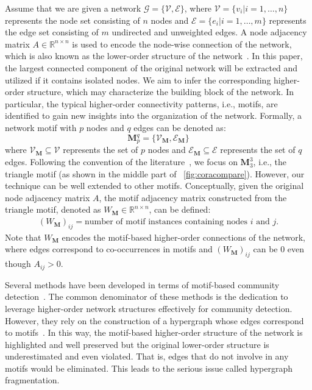 \documentclass[sigconf]{acmart}
\begin{document}
Assume that we are given a network $\mathcal{G}=\{\mathcal{V},\mathcal{E}\}$, where $\mathcal{V} = \{v_{i}|i=1,\dots,n\}$ represents the node set consisting of $n$ nodes and $\mathcal{E}=\{e_{i}|i=1,\dots,m\}$ represents the edge set consisting of $m$ undirected and unweighted edges. A node adjacency matrix $A\in \mathbb{R}^{n \times n}$ is used to encode the node-wise connection of the network, which is also known as the lower-order structure of the network~\cite{benson2016higher}. In this paper, the largest connected component of the original network will be extracted and utilized if it contains isolated nodes. We aim to infer the corresponding higher-order structure, which may characterize the building block of the network. In particular, the typical higher-order connectivity patterns, i.e., motifs, are identified to gain new insights into the organization of the network.
Formally, a network motif with $p$ nodes and $q$ edges can be denoted as:
\begin{equation}
\mathbf{M}_{p}^{q} = \{\mathcal{V}_\mathbf{M},\mathcal{E}_\mathbf{M}\}
\label{eq:motif}
\end{equation}
where ${\mathcal{V}_\mathbf{M}}\subseteq{\mathcal{V}}$ represents the set of $p$ nodes and ${\mathcal{E}_\mathbf{M}}\subseteq{\mathcal{E}}$ represents the set of $q$ edges. Following the convention of the literature~\cite{holland1977method,newman2003social,prat2016put}, we focus on $\mathbf{M}_{3}^{3}$, i.e., the triangle motif (as shown in the middle part of \figurename~\ref{fig:coracompare}). However, our technique can be well extended to other motifs. Conceptually, given the original node adjacency matrix $A$, the motif adjacency matrix constructed from the triangle motif, denoted as $W_{\mathbf{M}} \in \mathbb{R}^{n \times n}$, can be defined:
\begin{align}
\label{eq:Wm}
\mathit{(W_{\mathbf{M}})_{ij}} = \text{number of motif instances containing nodes $i$ and $j$.}
\end{align}
Note that $W_{\mathbf{M}}$ encodes the motif-based higher-order connections of the network, where edges correspond to co-occurrences in motifs and $(W_{\mathbf{M}})_{ij}$ can be 0 even though $A_{ij}>0$.

Several methods have been developed in terms of motif-based community detection~\cite{benson2016higher,tsourakakis2017scalable}. The common denominator of these methods is the dedication to leverage higher-order network structures effectively for community detection. However, they rely on the construction of a hypergraph whose edges correspond to motifs~\cite{benson2016higher}. In this way, the motif-based higher-order structure of the network is highlighted and well preserved but the original lower-order structure is underestimated and even violated. That is, edges that do not involve in any motifs would be eliminated. This leads to the serious issue called hypergraph fragmentation.
\end{document}
